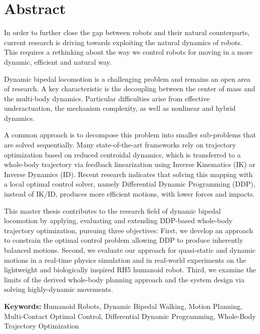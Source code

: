 \thispagestyle{empty}
\chapter*{Abstract}

In order to further close the gap between robots and their natural counterparts, current research is driving towards exploiting the natural dynamics of robots. This requires a rethinking about the way we control robots for moving in a more dynamic, efficient and natural way. 

Dynamic bipedal locomotion is a challenging problem and remains an open area of research. A key characteristic is the decoupling between the center of mass and the multi-body dynamics. Particular difficulties arise from effective underactuation, the mechanism complexity, as well as nonlinear and hybrid dynamics. 

A common approach is to decompose this problem into smaller sub-problems that are solved sequentially. Many state-of-the-art frameworks rely on trajectory optimization based on reduced centroidal dynamics, which is transferred to a whole-body trajectory via feedback linearization using Inverse Kinematics (IK) or Inverse Dynamics (ID). Recent research indicates that solving this mapping with a local optimal control solver, namely Differential Dynamic Programming (DDP), instead of IK/ID, produces more efficient motions, with lower forces and impacts. 

This master thesis contributes to the research field of dynamic bipedal locomotion by applying, evaluating and extending DDP-based whole-body trajectory optimization, pursuing three objectives: 
First, we develop an approach to constrain the optimal control problem allowing DDP to produce inherently balanced motions. 
Second, we evaluate our approach for quasi-static and dynamic motions in a real-time physics simulation and in real-world experiments on the lightweight and biologically inspired RH5 humanoid robot.
Third, we examine the limits of the derived whole-body planning approach and the system design via solving highly-dynamic movements. 

\vfill\vfill
\textbf{Keywords:} Humanoid Robots, Dynamic Bipedal Walking, Motion Planning, Multi-Contact Optimal Control, Differential Dynamic Programming, Whole-Body Trajectory Optimization  
 











